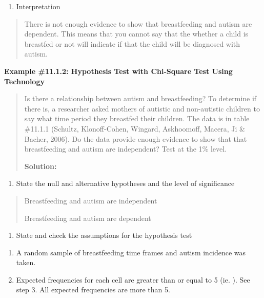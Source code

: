 \documentclass[]{book}
\providecommand{\tightlist}{%
  \setlength{\itemsep}{0pt}\setlength{\parskip}{0pt}}
\begin{document}
\begin{enumerate}
\def\labelenumi{\arabic{enumi}.}
\setcounter{enumi}{4}
\tightlist
\item
  Interpretation
\end{enumerate}

\begin{quote}
There is not enough evidence to show that breastfeeding and autism are dependent. This means that you cannot say that the whether a child is breastfed or not will indicate if that the child will be diagnosed with autism.
\end{quote}

\textbf{Example \#11.1.2: Hypothesis Test with Chi-Square Test Using
Technology}

\begin{quote}
Is there a relationship between autism and breastfeeding? To determine if there is, a researcher asked mothers of autistic and non-autistic children to say what time period they breastfed their children. The data is in table \#11.1.1 (Schultz, Klonoff-Cohen, Wingard, Askhoomoff, Macera, Ji \& Bacher, 2006). Do the data provide enough evidence to show that that breastfeeding and autism are independent? Test at the 1\% level.

\textbf{Solution:}
\end{quote}

\begin{enumerate}
\def\labelenumi{\arabic{enumi}.}
\tightlist
\item
  State the null and alternative hypotheses and the level of significance
\end{enumerate}

\begin{quote}
Breastfeeding and autism are independent

Breastfeeding and autism are dependent
\end{quote}

\begin{enumerate}
\def\labelenumi{\arabic{enumi}.}
\setcounter{enumi}{1}
\tightlist
\item
  State and check the assumptions for the hypothesis test
\end{enumerate}

\begin{enumerate}
\def\labelenumi{\alph{enumi}.}
\item
  A random sample of breastfeeding time frames and autism incidence was taken.
\item
  Expected frequencies for each cell are greater than or equal to 5 (ie. ). See step 3. All expected frequencies are more than 5.
\end{enumerate}
\end{document}
